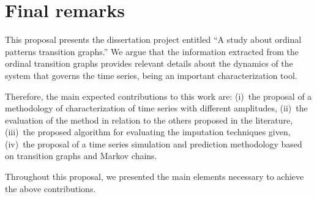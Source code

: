 \documentclass[paper=letter, fontsize=12pt]{article}
\begin{document}
	\section{Final remarks}\label{sec:final}
	
	This proposal presents the dissertation project entitled ``A study about ordinal patterns transition graphs.'' 
	We argue that the information extracted from the ordinal transition graphs provides relevant details about the dynamics of the system that governs the time series, being an important characterization tool.
	
	Therefore, the main expected contributions to this work are:
	(i)~the proposal of a methodology of characterization of time series with different amplitudes,
	(ii)~the evaluation of the method in relation to the others proposed in the literature, 
	(iii)~the proposed algorithm for evaluating the imputation techniques given, 
	(iv)~the proposal of a time series simulation and prediction methodology based on transition graphs and Markov chains.
	
	Throughout this proposal, we presented the main elements necessary to achieve the above contributions.
	
	
	
	
\end{document}
